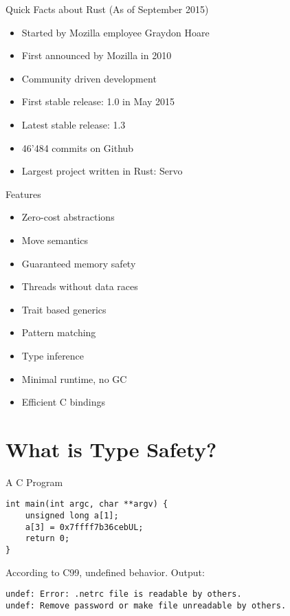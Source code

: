 \documentclass[aspectratio=1610,t]{beamer}
\begin{document}
\begin{frame}{Quick Facts about Rust}
	(As of September 2015)
	\begin{itemize}
		\item Started by Mozilla employee Graydon Hoare
		\item First announced by Mozilla in 2010
		\item Community driven development
		\item First stable release: 1.0 in May 2015
		\item Latest stable release: 1.3
		\item 46'484 commits on Github
		\item Largest project written in Rust: Servo
	\end{itemize}
\end{frame}


\begin{frame}{Features}
	\begin{itemize}
		\item Zero-cost abstractions
		\item Move semantics
		\item Guaranteed memory safety
		\item Threads without data races
		\item Trait based generics
		\item Pattern matching
		\item Type inference
		\item Minimal runtime, no GC
		\item Efficient C bindings
	\end{itemize}
\end{frame}


\section{What is Type Safety?}


\begin{frame}[fragile]{A C Program}
\begin{verbatim}
int main(int argc, char **argv) {
    unsigned long a[1];
    a[3] = 0x7ffff7b36cebUL;
    return 0;
}
\end{verbatim}
	According to C99, undefined behavior. Output:

	{\footnotesize \tt undef: Error: .netrc file is readable by others.\\
	undef: Remove password or make file unreadable by others.}
\end{frame}
\end{document}
